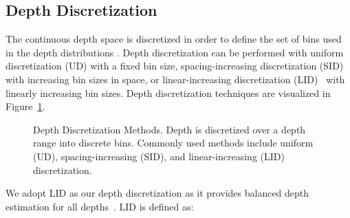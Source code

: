 \documentclass[final]{cvpr}
\begin{document}
\subsection{Depth Discretization} \label{sec:Depth Discretization}
The continuous depth space is discretized in order to define the set of  bins used in the depth distributions . Depth discretization can be performed with uniform discretization (UD) with a fixed bin size, spacing-increasing discretization (SID)~\cite{DORN}  with increasing bin sizes in  space, or linear-increasing discretization (LID)~\cite{Center3D} with linearly increasing bin sizes. Depth discretization techniques are visualized in Figure~\ref{fig:dist}.
\begin{figure}
\begin{center}

\end{center}
 \caption{Depth Discretization Methods. Depth  is discretized over a depth range  into  discrete bins. Commonly used methods include uniform (UD), spacing-increasing (SID), and linear-increasing (LID) discretization.}
\label{fig:dist}
\end{figure}
We adopt LID as our depth discretization as it provides balanced depth estimation for all depths~\cite{Center3D}. LID is defined as:
\end{document}
